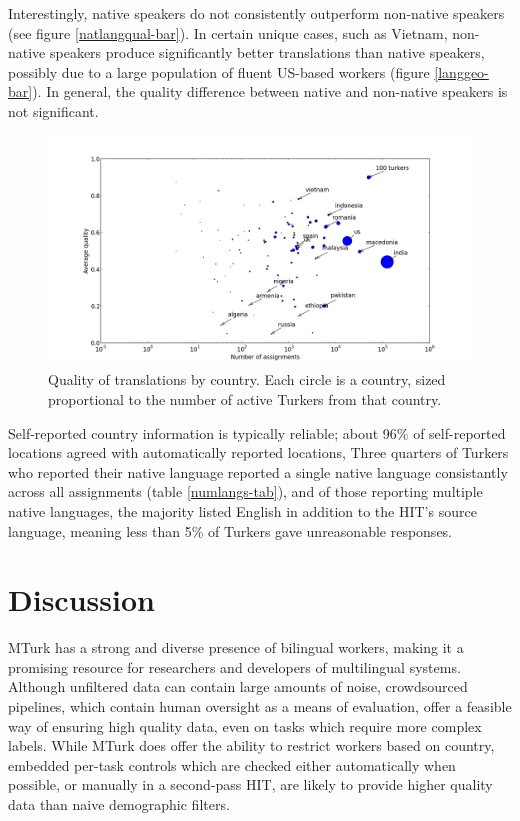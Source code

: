 \documentclass[11pt]{article}
\begin{document}
Interestingly, native speakers do not consistently outperform non-native speakers (see figure \ref{natlangqual-bar}). In certain unique cases, such as Vietnam, non-native speakers produce significantly better translations than native speakers, possibly due to a large population of fluent US-based workers (figure \ref{langgeo-bar}). In general, the quality difference between native and non-native speakers is not significant.	


\begin{figure}[h]
\centering
\includegraphics[width=6in]{figures/quality-scatter-avgturkers-country-labeled-new}
\caption{Quality of translations by country. Each circle is a country, sized proportional to the number of active Turkers from that country.}
\label{quality-scatter}
\end{figure}

Self-reported country information is typically reliable; about 96\% of self-reported locations agreed with automatically reported locations, 
Three quarters of Turkers who reported their native language reported a single native language consistantly across all assignments (table \ref{numlangs-tab}), and of those reporting multiple native languages, the majority listed English in addition to the HIT's source language, meaning less than 5\% of Turkers gave unreasonable responses.  

\section{Discussion}
MTurk has a strong and diverse presence of bilingual workers, making it a promising resource for researchers and developers of multilingual systems. Although unfiltered data can contain large amounts of noise, crowdsourced pipelines, which contain human oversight as a means of evaluation, offer a feasible way of ensuring high quality data, even on tasks which require more complex labels. While MTurk does offer the ability to restrict workers based on country, embedded per-task controls which are checked either automatically when possible, or manually in a second-pass HIT, are likely to provide higher quality data than naive demographic filters. 
\end{document}
